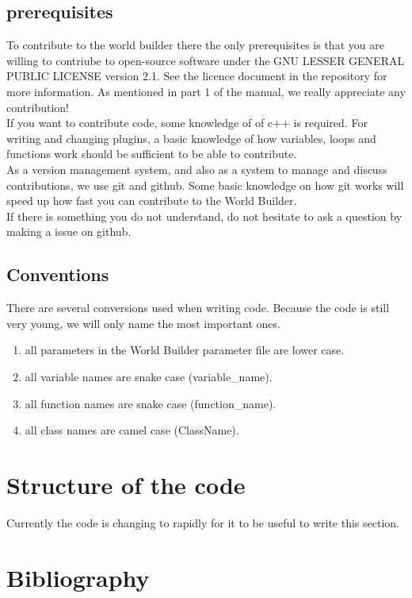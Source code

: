 \documentclass{book}
\newcommand{\WB}{{World Builder}}
\begin{document}
\section{prerequisites}
To contribute to the world builder there the only prerequisites is that you are willing to contriube to open-source software under the GNU LESSER GENERAL PUBLIC LICENSE version 2.1. See the licence document in the repository for more information. As mentioned in part 1 of the manual, we really appreciate any contribution!
\\
If you want to contribute code, some knowledge of of c++ is required. For writing and changing plugins, a basic knowledge of how variables, loops and functions work should be sufficient to be able to contribute. 
\\
As a version management system, and also as a system to manage and discuss contributions, we use git and github. Some basic knowledge on how git works will speed up how fast you can contribute to the \WB{}.
\\
If there is something you do not understand, do not hesitate to ask a question by making a issue on github.

\section{Conventions}
There are several conversions used when writing code. Because the code is still very young, we will only name the most important ones. 
\begin{enumerate}
    \item all parameters in the \WB{} parameter file are lower case.
    \item all variable names are snake case (variable\_name).
    \item all function names are snake case (function\_name).
    \item all class names are camel case (ClassName).
\end{enumerate}
\chapter{Structure of the code}
Currently the code is changing to rapidly for it to be useful to write this section.
\chapter*{Bibliography}
\printbibliography[heading=bibempty]
\end{document}
